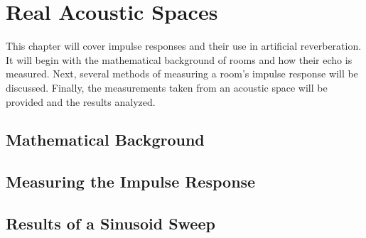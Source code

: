 \chapter{Real Acoustic Spaces}
\hspace*{-0.15cm}This chapter will cover impulse responses and their use in artificial reverberation. It will begin with the mathematical background of rooms and how their echo is measured. Next, several methods of measuring a room's impulse response will be discussed. Finally, the measurements taken from an acoustic space will be provided and the results analyzed.

\section{Mathematical Background}
\section{Measuring the Impulse Response}
\section{Results of a Sinusoid Sweep}
